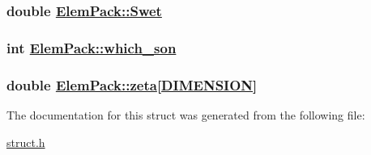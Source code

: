 \hypertarget{structElemPack_o46}{
\subsubsection[Swet]{\setlength{\rightskip}{0pt plus 5cm}double \hyperlink{structElemPack_o46}{Elem\-Pack::Swet}}}
\label{structElemPack_o46}


\hypertarget{structElemPack_o10}{
\subsubsection[which\_\-son]{\setlength{\rightskip}{0pt plus 5cm}int \hyperlink{structElemPack_o10}{Elem\-Pack::which\_\-son}}}
\label{structElemPack_o10}


\hypertarget{structElemPack_o37}{
\subsubsection[zeta]{\setlength{\rightskip}{0pt plus 5cm}double \hyperlink{structElemPack_o37}{Elem\-Pack::zeta}\mbox{[}\hyperlink{constant_8h_a15}{DIMENSION}\mbox{]}}}
\label{structElemPack_o37}




The documentation for this struct was generated from the following file:\begin{CompactItemize}
\item 
\hyperlink{struct_8h}{struct.h}\end{CompactItemize}
